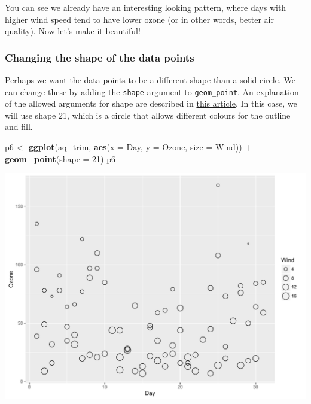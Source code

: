\documentclass[]{article}
\newenvironment{Shaded}{\begin{snugshade}}{\end{snugshade}}
\newcommand{\KeywordTok}[1]{\textcolor[rgb]{0.13,0.29,0.53}{\textbf{{#1}}}}
\newcommand{\DataTypeTok}[1]{\textcolor[rgb]{0.13,0.29,0.53}{{#1}}}
\newcommand{\DecValTok}[1]{\textcolor[rgb]{0.00,0.00,0.81}{{#1}}}
\newcommand{\StringTok}[1]{\textcolor[rgb]{0.31,0.60,0.02}{{#1}}}
\newcommand{\NormalTok}[1]{{#1}}
\begin{document}
You can see we already have an interesting looking pattern, where days
with higher wind speed tend to have lower ozone (or in other words,
better air quality). Now let's make it beautiful!

\subsubsection{Changing the shape of the data
points}\label{changing-the-shape-of-the-data-points-1}

Perhaps we want the data points to be a different shape than a solid
circle. We can change these by adding the \texttt{shape} argument to
\texttt{geom\_point}. An explanation of the allowed arguments for shape
are described in
\href{http://sape.inf.usi.ch/quick-reference/ggplot2/shape}{this
article}. In this case, we will use shape 21, which is a circle that
allows different colours for the outline and fill.

\begin{Shaded}
\begin{Highlighting}[]
\NormalTok{p6 <-}\StringTok{ }\KeywordTok{ggplot}\NormalTok{(aq_trim, }\KeywordTok{aes}\NormalTok{(}\DataTypeTok{x =} \NormalTok{Day, }\DataTypeTok{y =} \NormalTok{Ozone, }\DataTypeTok{size =} \NormalTok{Wind)) +}\StringTok{ }
\StringTok{      }\KeywordTok{geom_point}\NormalTok{(}\DataTypeTok{shape =} \DecValTok{21}\NormalTok{)}
\NormalTok{p6}
\end{Highlighting}
\end{Shaded}

\begin{center}\includegraphics{0_all_posts_pdf/wscatter_3-1} \end{center}
\end{document}
